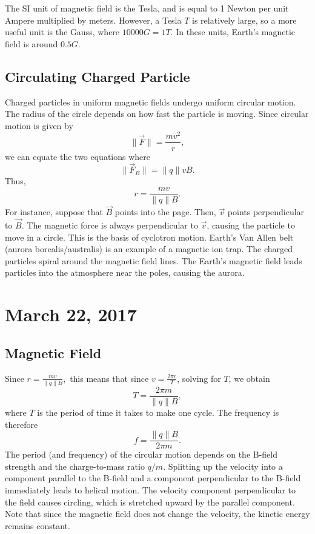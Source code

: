 \documentclass[11pt]{article}
\theoremstyle{plain} %
\theoremstyle{definition}
\theoremstyle{example}
\theoremstyle{remark}
\begin{document}
The SI unit of magnetic field is the Tesla, and is equal to 1 Newton per unit Ampere multiplied by meters. However, a Tesla $T$ is relatively large, so a more useful unit is the Gauss, where $10000G = 1T$. In these units, Earth's magnetic field is around $0.5G$. 

\subsection{Circulating Charged Particle}
Charged particles in uniform magnetic fields undergo uniform circular motion. The radius of the circle depends on how fast the particle is moving. Since circular motion is given by 
$$\|\vec{F}\| = \frac{mv^2}{r},$$
we can equate the two equations where
$$\|\vec{F}_B\| = \|q\|vB.$$
Thus, $$r = \frac{mv}{\|q\|B}.$$
For instance, suppose that $\vec{B}$ points into the page. Then, $\vec{v}$ points perpendicular to $\vec{B}$. The magnetic force is always  perpendicular to $\vec{v}$, causing the particle to move in a circle. This is the basis of cyclotron motion. Earth's Van Allen belt (aurora borealis/australis) is an example of a magnetic ion trap. The charged particles spiral around the magnetic field lines. The Earth's magnetic field leads particles into the atmosphere near the poles, causing the aurora. 

\section{March 22, 2017}
\subsection{Magnetic Field}
Since $r = \frac{mv}{\|q\|B},$ this means that since $v = \frac{2\pi r}{T}$, solving for $T$, we obtain 
$$T = \frac{2\pi m}{\|q\|B},$$
where $T$ is the period of time it takes to make one cycle. The frequency is therefore 
$$f = \frac{\|q\|B}{2\pi m}.$$
The period (and frequency) of the circular motion depends on the B-field strength and the charge-to-mass ratio $q/m$. Splitting up the velocity into a component parallel to the B-field and a component perpendicular to the B-field immediately leads to helical motion. The velocity component perpendicular to the field causes circling, which is stretched upward by the parallel component. Note that since the magnetic field does not change the velocity, the kinetic energy remains constant. 
\end{document}
